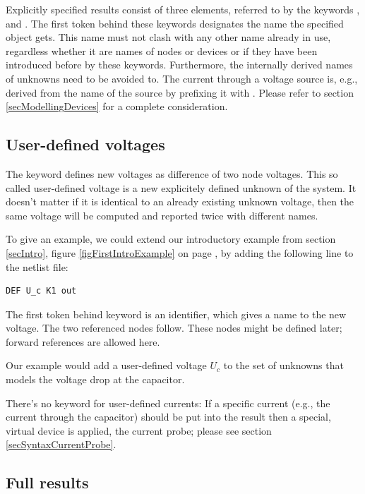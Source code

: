 
Explicitly specified results consist of three elements, referred to by the
keywords ,  and . The first token behind these
keywords designates the name the specified object gets. This name must not
clash with any other name already in use, regardless whether it are names
of nodes or devices or if they have been introduced before by these
keywords. Furthermore, the internally derived names of unknowns need to be
avoided to. The current through a voltage source is, e.g., derived from the
name of the source by prefixing it with . Please refer to section
\ref{secModellingDevices} for a complete consideration.


\subsection{User-defined voltages}
\label{secUserDefVoltage}

The keyword  defines new voltages as difference of two node
voltages. This so called user-defined voltage is a new explicitely defined
unknown of the system. It doesn't matter if it is identical to an already
existing unknown voltage, then the same voltage will be computed and
reported twice with different names.

To give an example, we could extend our introductory example from section
\ref{secIntro}, figure \ref{figFirstIntroExample} on page
\pageref{figFirstIntroExample}, by adding the following line to the
netlist file:

\begin{verbatim}
DEF U_c K1 out
\end{verbatim}

The first token behind keyword  is an identifier, which gives a
name to the new voltage. The two referenced nodes follow. These nodes
might be defined later; forward references are allowed here.

Our example would add a user-defined voltage $U_c$ to the set of
unknowns that models the voltage drop at the capacitor.

There's no keyword for user-defined currents: If a specific current (e.g.,
the current through the capacitor) should be put into the result then a
special, virtual device is applied, the current probe; please see section
\ref{secSyntaxCurrentProbe}.


\subsection{Full results}

